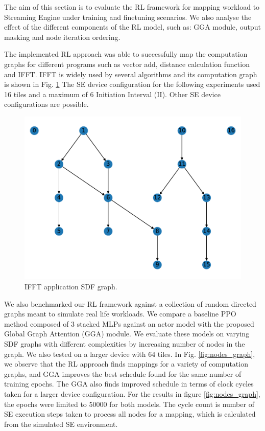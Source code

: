
The aim of this section is to evaluate the RL framework for mapping workload to Streaming Engine under training and finetuning scenarios. 
We also analyse the effect of the different components of the RL model, such as: GGA module, output masking and node iteration ordering.

The implemented RL approach was able to successfully map the computation graphs for different programs such as vector add, distance calculation function and IFFT. 
IFFT is widely used by several algorithms and its computation graph is shown in Fig. \ref{fig:ifft_graph} 
The SE device configuration for the following experiments used 16 tiles and a maximum of 6 Initiation Interval (II).
Other SE device configurations are possible.

\begin{figure}[h]
  \centering
  \includegraphics[scale=0.4]{fig/ifft_graph.pdf}
  \caption{IFFT application SDF graph.}
  \label{fig:ifft_graph}
\end{figure}


We also benchmarked our RL framework against a collection of random directed graphs meant to simulate real life workloads. 
We compare a baseline PPO method composed of 3 stacked MLPs against an actor model with the proposed Global Graph Attention (GGA) module.
We evaluate these models on varying SDF graphs with different complexities by increasing number of nodes in the graph. 
We also tested on a larger device with 64 tiles.
In Fig. \ref{fig:nodes_graph}, we observe that the RL approach finds mappings for a variety of computation graphs, and GGA
improves the best schedule found for the same number of training epochs. The GGA also finds improved schedule in terms of clock cycles taken for a larger device configuration. 
For the results in figure \ref{fig:nodes_graph}, the epochs were limited to 50000 for both models. 
The cycle count is number of SE execution steps taken to process all nodes for a mapping, which is calculated from the simulated SE environment. 

